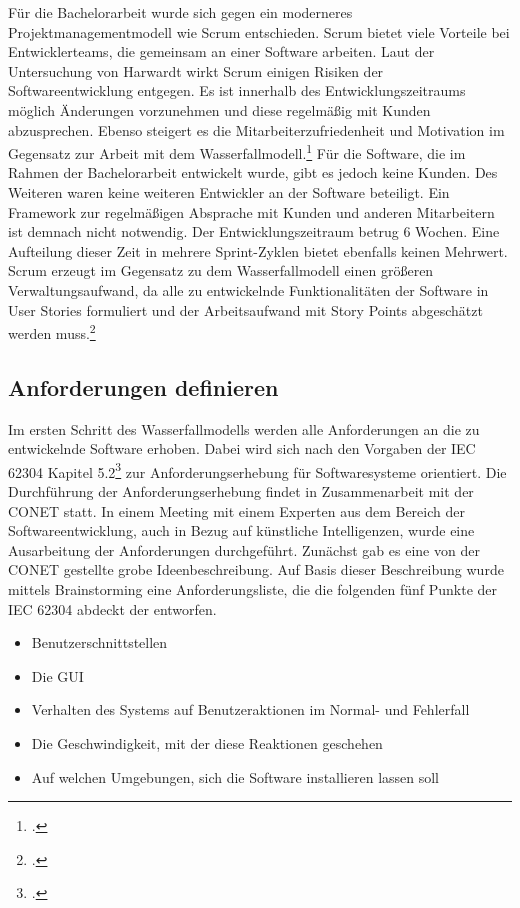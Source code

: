 Für die Bachelorarbeit wurde sich gegen ein moderneres Projektmanagementmodell wie Scrum entschieden. Scrum bietet viele Vorteile bei Entwicklerteams, die gemeinsam an einer Software arbeiten. Laut der Untersuchung von Harwardt wirkt Scrum einigen Risiken der Softwareentwicklung entgegen. Es ist innerhalb des Entwicklungszeitraums möglich Änderungen vorzunehmen und diese regelmäßig mit Kunden abzusprechen. Ebenso steigert es die Mitarbeiterzufriedenheit und Motivation im Gegensatz zur Arbeit mit dem Wasserfallmodell.\footcite{harwardt2012wasserfallmodell} Für die Software, die im Rahmen der Bachelorarbeit entwickelt wurde, gibt es jedoch keine Kunden. Des Weiteren waren keine weiteren Entwickler an der Software beteiligt. Ein Framework zur regelmäßigen Absprache mit Kunden und anderen Mitarbeitern ist demnach nicht notwendig. Der Entwicklungszeitraum betrug 6 Wochen. Eine Aufteilung dieser Zeit in mehrere Sprint-Zyklen bietet ebenfalls keinen Mehrwert. Scrum erzeugt im Gegensatz zu dem Wasserfallmodell einen größeren Verwaltungsaufwand, da alle zu entwickelnde Funktionalitäten der Software in User Stories formuliert und der Arbeitsaufwand mit Story Points abgeschätzt werden muss.\footcite{wirdemann2022scrum}

\subsection{Anforderungen definieren}
Im ersten Schritt des Wasserfallmodells werden alle Anforderungen an die zu entwickelnde Software erhoben. Dabei wird sich nach den Vorgaben der IEC 62304 Kapitel 5.2\footcite{daniel2018anforderungen} zur Anforderungserhebung für Softwaresysteme orientiert. Die Durchführung der Anforderungserhebung findet in Zusammenarbeit mit der CONET statt. In einem Meeting mit einem Experten aus dem Bereich der Softwareentwicklung, auch in Bezug auf künstliche Intelligenzen, wurde eine Ausarbeitung der Anforderungen durchgeführt. Zunächst gab es eine von der CONET gestellte grobe Ideenbeschreibung. Auf Basis dieser Beschreibung wurde mittels Brainstorming eine Anforderungsliste, die die folgenden fünf Punkte der IEC 62304 abdeckt der entworfen.

\begin{itemize}
\item Benutzerschnittstellen
\item Die GUI
\item Verhalten des Systems auf Benutzeraktionen im Normal- und Fehlerfall
\item Die Geschwindigkeit, mit der diese Reaktionen geschehen
\item Auf welchen Umgebungen, sich die Software installieren lassen soll
\end{itemize}


